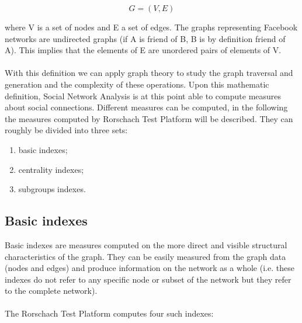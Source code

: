 \begin{equation}
G = (V, E)
\label{eq:graph}
\end{equation}

where V is a set of nodes and E a set of edges.
The graphs representing Facebook networks are undirected graphs (if A is friend of B, B is by definition friend of A).
This implies that the elements of E are unordered pairs of elements of V.\\
\\
With this definition we can apply graph theory to study the graph traversal and generation and the complexity of these operations.
Upon this mathematic definition, Social Network Analysis is at this point able to compute measures about social connections.
Different measures can be computed, in the following the measures computed by Rorschach Test Platform will be described.
They can roughly be divided into three sets:
\begin{enumerate}
\item basic indexes;
\item centrality indexes;
\item subgroups indexes.
\end{enumerate}

\label{sec:basicindexes}
\subsection{Basic indexes}
Basic indexes are measures computed on the more direct and visible structural characteristics of the graph.
They can be easily measured from the graph data (nodes and edges) and produce information on the network as a whole
(i.e. these indexes do not refer to any specific node or subset of the network but they refer to the complete network).\\
\\
The Rorschach Test Platform computes four such indexes:

